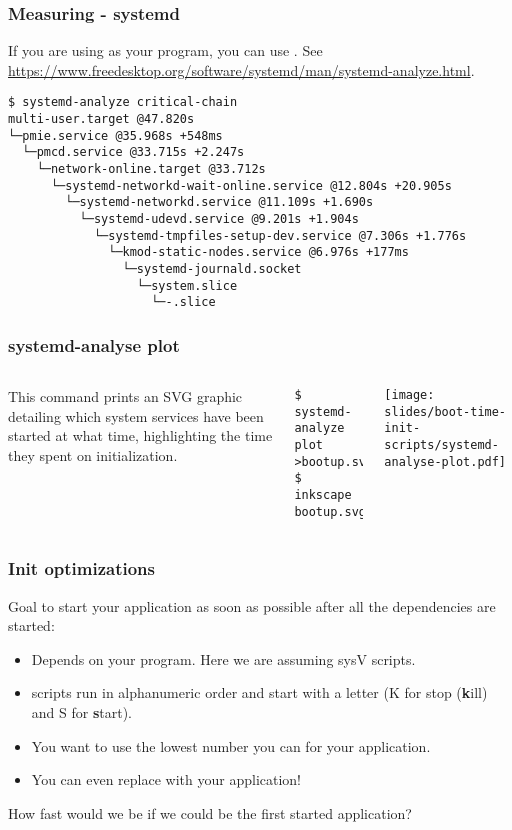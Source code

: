 \begin{frame}[fragile]
\frametitle{Measuring - systemd}
If you are using  as your  program, you can use
. See
\url{https://www.freedesktop.org/software/systemd/man/systemd-analyze.html}.\\
\begin{block}{}
\tiny
\begin{verbatim}
$ systemd-analyze critical-chain
multi-user.target @47.820s
└─pmie.service @35.968s +548ms
  └─pmcd.service @33.715s +2.247s
    └─network-online.target @33.712s
      └─systemd-networkd-wait-online.service @12.804s +20.905s
        └─systemd-networkd.service @11.109s +1.690s
          └─systemd-udevd.service @9.201s +1.904s
            └─systemd-tmpfiles-setup-dev.service @7.306s +1.776s
              └─kmod-static-nodes.service @6.976s +177ms
                └─systemd-journald.socket
                  └─system.slice
                    └─-.slice
\end{verbatim}
\end{block}
\end{frame}

\begin{frame}[fragile]
\frametitle{systemd-analyse plot}
\begin{columns}
This command prints an SVG graphic detailing which system services have been started at what time,
highlighting the time they spent on initialization.
\begin{verbatim}
$ systemd-analyze plot >bootup.svg
$ inkscape bootup.svg
\end{verbatim}
\texttt{[image: slides/boot-time-init-scripts/systemd-analyse-plot.pdf]}
\end{columns}
\end{frame}


\begin{frame}
\frametitle{Init optimizations}
Goal to start your application as soon as possible after all the dependencies are started:
\begin{itemize}
	\item Depends on your  program. Here we are assuming sysV
	       scripts.
	\item {} scripts run in alphanumeric order and start with
	      a letter (K for stop ({\bf k}ill) and S for {\bf s}tart).
	\item You want to use the lowest number you can for your application.
	\item You can even replace  with your application!
\end{itemize}
How fast would we be if we could be the first started application?
\end{frame}

